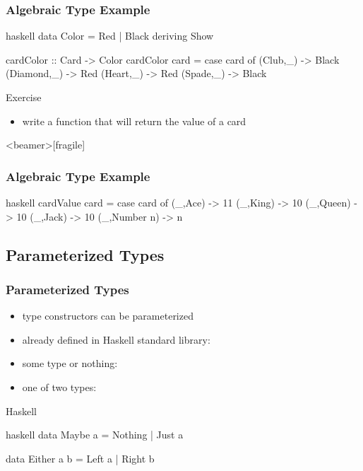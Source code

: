 \documentclass[dvipsnames]{beamer}
\theoremstyle{plain}
\begin{document}
\begin{frame}[fragile]
  \frametitle{Algebraic Type Example}

  \begin{example}
    \pause
    \begin{pygments}{haskell}
data Color = Red | Black
             deriving Show

cardColor :: Card -> Color
cardColor card =
    case card of
      (Club,_) -> Black
      (Diamond,_) -> Red
      (Heart,_) -> Red
      (Spade,_) -> Black
    \end{pygments}
  \end{example}

  \pause
  \begin{block}{Exercise}
    \begin{itemize}
      \item write a function that will return the value of a card
    \end{itemize}
  \end{block}
\end{frame}

\begin{frame}<beamer>[fragile]
  \frametitle{Algebraic Type Example}

  \begin{example}
    \begin{pygments}{haskell}
cardValue card =
    case card of
      (_,Ace) -> 11
      (_,King) -> 10
      (_,Queen) -> 10
      (_,Jack) -> 10
      (_,Number n) -> n
    \end{pygments}
  \end{example}
\end{frame}

\subsection{Parameterized Types}

\begin{frame}[fragile]
  \frametitle{Parameterized Types}

  \begin{itemize}
    \item type constructors can be parameterized

    \pause
    \bigskip
    \item already defined in Haskell standard library:
    \item some type or nothing: 
    \item one of two types: 
  \end{itemize}

  \begin{block}{Haskell}
    \begin{pygments}{haskell}
data Maybe a = Nothing | Just a

data Either a b = Left a | Right b
    \end{pygments}
  \end{block}
\end{frame}
\end{document}
